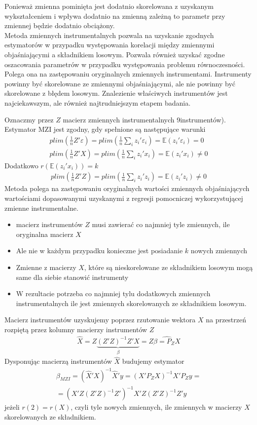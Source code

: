 Ponieważ zmienna pominięta jest dodatnio skorelowana z uzyskanym wykształceniem i wpływa dodatnio na zmienną zależną to parametr przy zmiennej będzie dodatnio obciążony.\\
Metoda zmiennych instrumentalnych pozwala na uzyskanie zgodnych estymatorów w przypadku występowania korelacji między zmiennymi objaśniającymi a składnikiem losowym. Pozwala również uzyskać zgodne oszacowania parametrów w przypadku występowania problemu równoczesności. Polega ona na zastępowaniu oryginalnych zmiennych instrumentami. Instrumenty powinny być skorelowane ze zmiennymi objaśniającymi, ale nie powinny być skorelowane z błędem losowym. Znalezienie właściwych instrumentów jest najciekawszym, ale również najtrudniejszym etapem badania.

Oznaczmy przez $ Z $ macierz zmiennych instrumentalnych 9instrumentów). Estymator MZI jest zgodny, gdy spełnione są następujące warunki
\begin{gather*}
plim\left(\tfrac{1}{n}Z'\varepsilon\right)=plim\left(\tfrac{1}{n}\sum_iz_i'\varepsilon_i\right)=\mathbb E \left(z_i'\varepsilon_i\right)=0\\
plim\left(\tfrac{1}{n}Z'X\right)=plim\left(\tfrac{1}{n}\sum_iz_i'x_i\right)=\mathbb E \left(z_i'x_i\right)\neq0
\end{gather*}
Dodatkowo $ r\left(\mathbb E \left(z_i'x_i\right)\right) =k$
\begin{gather*}
plim\left(\tfrac{1}{n}Z'Z\right)=plim\left(\tfrac{1}{n}\sum_iz_i'z_i\right)=\mathbb E \left(z_i'z_i\right)\neq0
\end{gather*}
Metoda polega na zastępowaniu oryginalnych wartości zmiennych objaśniających wartościami dopasowanymi uzyskanymi z regresji pomocniczej wykorzystującej zmienne instrumentalne.
\begin{itemize}
	\item macierz instrumentów $ Z $ musi zawierać co najmniej tyle zmiennych, ile oryginalna macierz $ X $
	\item Ale nie w każdym przypadku konieczne jest posiadanie $ k $ nowych zmiennych
	\item Zmienne z macierzy $ X $, które są nieskorelowane ze składnikiem losowym mogą same dla siebie stanowić instrumenty
	\item W rezultacie potrzeba co najmniej tylu dodatkowych zmiennych instrumentalnych ile jest zmiennych skorelowanych ze składnikiem losowym.
\end{itemize}
Macierz instrumentów uzyskujemy poprzez rzutowanie wektora $ X $ na przestrzeń rozpiętą przez kolumny macierzy instrumentów $ Z $
\begin{gather*}
\hat{X}=Z\underset{\beta}{\underbrace{\left(Z'Z\right)^{-1}Z'X}}=Z\hat{\beta=P_ZX}
\end{gather*}
Dysponując macierzą instrumentów $ \hat X $ budujemy estymator
\begin{gather*}
\beta_{MZI}=\left(\hat X'X\right)^{-1}\hat X'y=\left(X'P_ZX\right)^{-1}X'P_Zy=\\=
\left(X'Z\left(Z'Z\right)^{-1}Z'\right)^{-1}X'Z\left(Z'Z\right)^{-1}Z'y
\end{gather*}
jeżeli $ r(2)=r(X)$, czyli tyle nowych zmiennych, ile zmiennych w macierzy $ X $ skorelowanych ze składnikiem.

